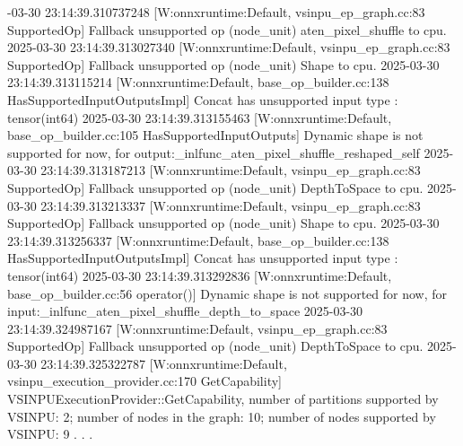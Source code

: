 -03-30 23:14:39.310737248 [W:onnxruntime:Default, vsinpu_ep_graph.cc:83 SupportedOp] Fallback unsupported op (node_unit) aten_pixel_shuffle  to cpu.
2025-03-30 23:14:39.313027340 [W:onnxruntime:Default, vsinpu_ep_graph.cc:83 SupportedOp] Fallback unsupported op (node_unit) Shape  to cpu.
2025-03-30 23:14:39.313115214 [W:onnxruntime:Default, base_op_builder.cc:138 HasSupportedInputOutputsImpl] Concat has unsupported input type : tensor(int64)
2025-03-30 23:14:39.313155463 [W:onnxruntime:Default, base_op_builder.cc:105 HasSupportedInputOutputs] Dynamic shape is not supported for now, for output:_inlfunc_aten_pixel_shuffle_reshaped_self
2025-03-30 23:14:39.313187213 [W:onnxruntime:Default, vsinpu_ep_graph.cc:83 SupportedOp] Fallback unsupported op (node_unit) DepthToSpace  to cpu.
2025-03-30 23:14:39.313213337 [W:onnxruntime:Default, vsinpu_ep_graph.cc:83 SupportedOp] Fallback unsupported op (node_unit) Shape  to cpu.
2025-03-30 23:14:39.313256337 [W:onnxruntime:Default, base_op_builder.cc:138 HasSupportedInputOutputsImpl] Concat has unsupported input type : tensor(int64)
2025-03-30 23:14:39.313292836 [W:onnxruntime:Default, base_op_builder.cc:56 operator()] Dynamic shape is not supported for now, for input:_inlfunc_aten_pixel_shuffle_depth_to_space
2025-03-30 23:14:39.324987167 [W:onnxruntime:Default, vsinpu_ep_graph.cc:83 SupportedOp] Fallback unsupported op (node_unit) DepthToSpace  to cpu.
2025-03-30 23:14:39.325322787 [W:onnxruntime:Default, vsinpu_execution_provider.cc:170 GetCapability] VSINPUExecutionProvider::GetCapability, number of partitions supported by VSINPU: 2; number of nodes in the graph: 10; number of nodes supported by VSINPU: 9
\endtt
.
.
.

